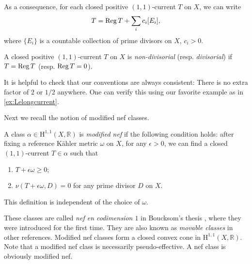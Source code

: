As a consequence, for each closed positive $(1,1)$-current $T$ on $X$, we can write
\begin{equation}\label{eq:Siudec}
    T=\operatorname{Reg} T+\sum_{i} c_i [E_i],
\end{equation}
where $\{E_i\}$ is a countable collection of prime divisors on $X$, $c_i>0$.

\begin{definition}\label{def:nd_curr}
    A closed positive $(1,1)$-current $T$ on $X$ is \emph{non-divisorial} (resp. \emph{divisorial}) if $T=\operatorname{Reg} T$ (resp. $\operatorname{Reg} T=0$).
\end{definition}

It is helpful to check that our conventions are always consistent: There is no extra factor of $2$ or $1/2$ anywhere. One can verify this using our favorite example as in \cref{ex:Lelongcurrent}.

Next we recall the notion of modified nef classes.

\begin{definition}\label{def:mnclass}
    A class $\alpha\in \mathrm{H}^{1,1}(X,\mathbb{R})$ is \emph{modified nef} if the following condition holds: after fixing a reference Kähler metric $\omega$ on $X$, for any $\epsilon>0$, we can find a closed $(1,1)$-current $T\in \alpha$ such that
    \begin{enumerate}
        \item\label{itm:def:mnclass:1} $T+\epsilon\omega\geq 0$;
        \item\label{itm:def:mnclass:2} $\nu(T+\epsilon\omega,D)=0$ for any prime divisor $D$ on $X$.
    \end{enumerate}
    This definition is independent of the choice of $\omega$.
\end{definition}
These classes are called \emph{nef en codimension $1$} in Boucksom's thesis \cite{Bou02}, where they were introduced for the first time. They are also known as \emph{movable classes} in other references.
Modified nef classes form a closed convex cone in $\mathrm{H}^{1,1}(X,\mathbb{R})$. Note that a modified nef class is necessarily pseudo-effective. A nef class is obviously modified nef.

